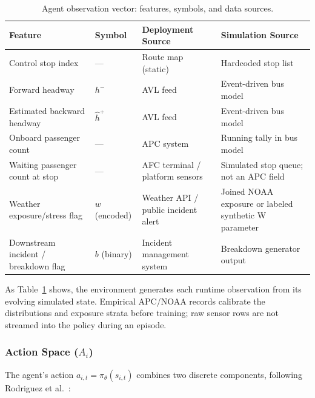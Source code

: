 \begin{table}[htbp]
\centering
\caption{Agent observation vector: features, symbols, and data sources.}
\label{tab:observation-features}
\small
\renewcommand{\arraystretch}{1.25}

\begin{tabularx}{\textwidth}{
>{\RaggedRight\arraybackslash}p{}
>{\RaggedRight\arraybackslash}p{}
>{\RaggedRight\arraybackslash}X
>{\RaggedRight\arraybackslash}X
}

\toprule
\textbf{Feature} & \textbf{Symbol} & \textbf{Deployment Source} & \textbf{Simulation Source} \\
\midrule

Control stop index & --- & Route map (static) & Hardcoded stop list \\
Forward headway & $h^-$ & AVL feed & Event-driven bus model \\
Estimated backward headway & $\hat{h}^+$ & AVL feed & Event-driven bus model \\
Onboard passenger count & --- & APC system & Running tally in bus model \\
Waiting passenger count at stop & --- & AFC terminal / platform sensors & Simulated stop queue; not an APC field \\
Weather exposure/stress flag & $w$ (encoded) & Weather API / public incident alert & Joined NOAA exposure or labeled synthetic W parameter \\
Downstream incident / breakdown flag & $b$ (binary) & Incident management system & Breakdown generator output \\

\bottomrule
\end{tabularx}
\end{table}

As Table~\ref{tab:observation-features} shows, the environment generates each runtime observation from its evolving simulated state. Empirical APC/NOAA records calibrate the distributions and exposure strata before training; raw sensor rows are not streamed into the policy during an episode.

\subsubsection{Action Space ($A_i$)}
\label{subsec:action-space}

The agent's action $a_{i,t} = \pi_\theta(s_{i,t})$ combines two discrete components, following Rodriguez et al.~\cite{Rodriguez2023Cooperative}:

